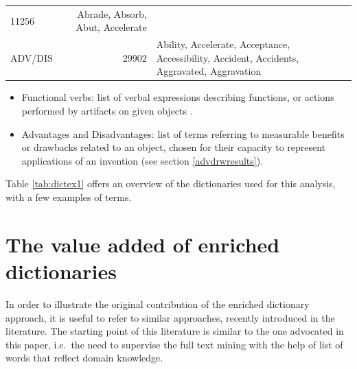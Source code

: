 \documentclass[b5paper,]{book}
\theoremstyle{definition}
\theoremstyle{definition}
\theoremstyle{definition}
\theoremstyle{remark}
\begin{document}
\begin{longtable}[]{@{}lrl@{}}
\begin{minipage}[t]{0.12\columnwidth}
11256\strut
\end{minipage} & \begin{minipage}[t]{0.62\columnwidth}\raggedright\strut
Abrade, Absorb, Abut, Accelerate\strut
\end{minipage}\tabularnewline
\begin{minipage}[t]{0.17\columnwidth}\raggedright\strut
ADV/DIS\strut
\end{minipage} & \begin{minipage}[t]{0.12\columnwidth}\raggedleft\strut
29902\strut
\end{minipage} & \begin{minipage}[t]{0.62\columnwidth}\raggedright\strut
Ability, Accelerate, Acceptance, Accessibility, Accident, Accidents,
Aggravated, Aggravation\strut
\end{minipage}\tabularnewline
\bottomrule
\end{longtable}

\begin{itemize}
\item
  Functional verbs: list of verbal expressions describing functions, or
  actions performed by artifacts on given objects
  \citep{fantoni2013automatic, apreda2016functional}.
\item
  Advantages and Disadvantages: list of terms referring to measurable
  benefits or drawbacks related to an object, chosen for their capacity
  to represent applications of an invention (see section
  \ref{advdrwresults}).
\end{itemize}

Table \ref{tab:dictex1} offers an overview of the dictionaries used for
this analysis, with a few examples of terms.

\section{The value added of enriched
dictionaries}\label{the-value-added-of-enriched-dictionaries}

In order to illustrate the original contribution of the enriched
dictionary approach, it is useful to refer to similar approaches,
recently introduced in the literature. The starting point of this
literature is similar to the one advocated in this paper, i.e.~the need
to supervise the full text mining with the help of list of words that
reflect domain knowledge.
\end{document}

